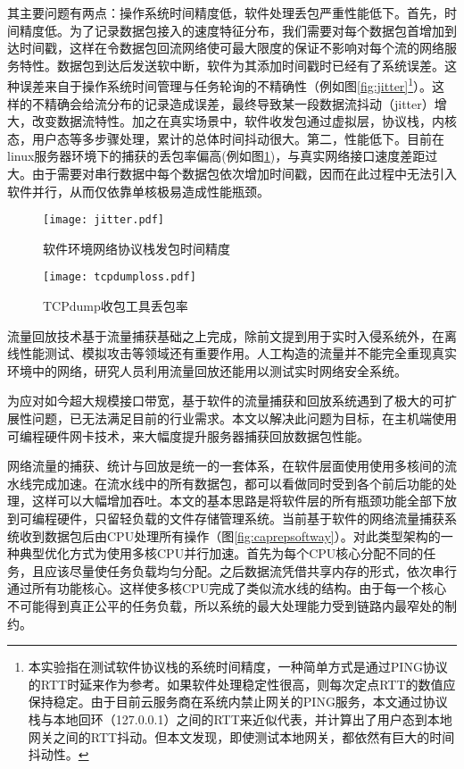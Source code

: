 其主要问题有两点：操作系统时间精度低，软件处理丢包严重性能低下。首先，时间精度低。为了记录数据包接入的速度特征分布，我们需要对每个数据包首增加到达时间戳，这样在令数据包回流网络使可最大限度的保证不影响对每个流的网络服务特性。数据包到达后发送软中断，软件为其添加时间戳时已经有了系统误差。这种误差来自于操作系统时间管理与任务轮询的不精确性（例如图\ref{fig:jitter}\footnote{本实验指在测试软件协议栈的系统时间精度，一种简单方式是通过PING协议的RTT时延来作为参考。如果软件处理稳定性很高，则每次定点RTT的数值应保持稳定。由于目前云服务商在系统内禁止网关的PING服务，本文通过协议栈与本地回环（127.0.0.1）之间的RTT来近似代表，并计算出了用户态到本地网关之间的RTT抖动。但本文发现，即使测试本地网关，都依然有巨大的时间抖动性。}）。这样的不精确会给流分布的记录造成误差，最终导致某一段数据流抖动（jitter）增大，改变数据流特性。加之在真实场景中，软件收发包通过虚拟层，协议栈，内核态，用户态等多步骤处理，累计的总体时间抖动很大。第二，性能低下。目前在linux服务器环境下的捕获的丢包率偏高(例如图\ref{fig:tcpdumploss})，与真实网络接口速度差距过大。由于需要对串行数据中每个数据包依次增加时间戳，因而在此过程中无法引入软件并行，从而仅依靠单核极易造成性能瓶颈。



\begin{figure}[htbp]
	\centering
	\begin{minipage}[t]{0.48\textwidth}
		\centering
		\texttt{[image: jitter.pdf]}
		\caption{软件环境网络协议栈发包时间精度} \label{fig:jitter}
	\end{minipage}
	\begin{minipage}[t]{0.48\textwidth}
		\centering
		\texttt{[image: tcpdumploss.pdf]}
		\caption{TCPdump收包工具丢包率} \label{fig:tcpdumploss}
	\end{minipage}
\end{figure}

流量回放技术基于流量捕获基础之上完成，除前文提到用于实时入侵系统外，在离线性能测试、模拟攻击等领域还有重要作用。人工构造的流量并不能完全重现真实环境中的网络，研究人员利用流量回放还能用以测试实时网络安全系统。

为应对如今超大规模接口带宽，基于软件的流量捕获和回放系统遇到了极大的可扩展性问题，已无法满足目前的行业需求。本文以解决此问题为目标，在主机端使用可编程硬件网卡技术，来大幅度提升服务器捕获回放数据包性能。




网络流量的捕获、统计与回放是统一的一套体系，在软件层面使用使用多核间的流水线完成加速。在流水线中的所有数据包，都可以看做同时受到各个前后功能的处理，这样可以大幅增加吞吐。本文的基本思路是将软件层的所有瓶颈功能全部下放到可编程硬件，只留轻负载的文件存储管理系统。当前基于软件的网络流量捕获系统收到数据包后由CPU处理所有操作（图\ref{fig:caprepsoftway}）。对此类型架构的一种典型优化方式为使用多核CPU并行加速。首先为每个CPU核心分配不同的任务，且应该尽量使任务负载均匀分配。之后数据流凭借共享内存的形式，依次串行通过所有功能核心。这样使多核CPU完成了类似流水线的结构。由于每一个核心不可能得到真正公平的任务负载，所以系统的最大处理能力受到链路内最窄处的制约。



